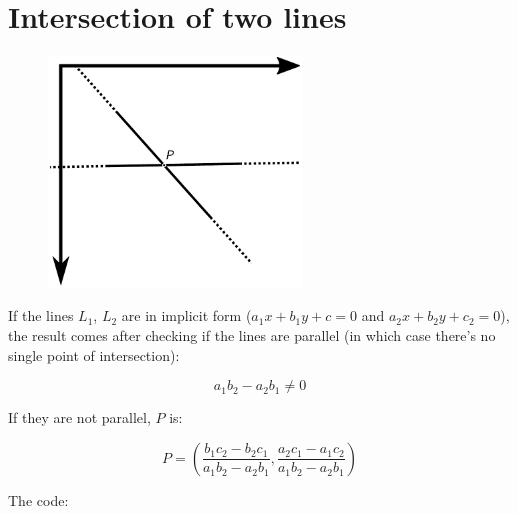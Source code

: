 \documentclass[12pt,openany,a4,usenames,dvipsnames]{book}
\begin{document}
\chapter{Intersection of two lines}\label{ch:intersection-lines}
\begin{figure}[H]
\centering
\includegraphics[width=0.6\textwidth,keepaspectratio]{figures/intersection_lines.pdf}
\end{figure}
If the lines $L_1$, $L_2$ are in implicit form ($a_1x+b_1y+c=0$ and $a_2x+b_2y+c_2=0$), the result comes after checking if the lines are parallel (in which case there's no single point of intersection):

$$a_1b_2-a_2b_1 \neq{} 0$$

If they are not parallel, $P$ is:

$$P = \left(\frac{b_1c_2-b_2c_1}{a_1b_2-a_2b_1}, \frac{a_2c_1-a_1c_2}{a_1b_2-a_2b_1}\right)$$

\noindent{}The code:
\end{document}
